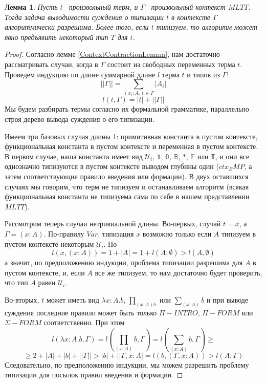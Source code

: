 \documentclass{article}[12pt]
\newtheorem{lemma}{Лемма}
\newcommand{\dash}{\textemdash\ }
\begin{document}
\begin{lemma}
    \label{TypingDecidabilityLemma}
    Пусть $t$ \dash произвольный терм, и $\Gamma$ \dash произвольный контекст $MLTT$. Тогда задача выводимости
    суждения о типизации $t$ в контексте $\Gamma$ алгоритмически разрешима. Более того,
    если $t$ типизуем, то алгоритм может явно предъявить некоторый тип $T$ для $t$.
\end{lemma}
\begin{proof}
    Согласно лемме \ref{ContextContractionLemma}, нам достаточно рассматривать случаи, когда в $\Gamma$ состоит
    из свободных переменных терма $t$. Проведем индукцию по длине суммарной длине $l$ терма $t$ и типов из $\Gamma$:
    $$||\Gamma|| = \sum \limits_{(x_i : A_i) \in \Gamma} |A_i|$$
    $$l(t, \Gamma) = |t| + ||\Gamma||$$
    Мы будем разбирать термы согласно их формальной грамматике, параллельно строя дерево вывода суждения о его
    типизации.

    Имеем три базовых случая длины 1: примитивная константа в пустом контексте, функциональная константа в пустом
    контексте и переменная в пустом контексте. В первом случае, наша константа имеет вид $\mathcal U_i$, 
    $\mathbb 1$, $\mathbb 0$, $\mathbb B$, $*$, $\mathbb F$ или $\mathbb  T$, и они все однозначно типизуются в пустом контексте
    выводом глубины один ($ctx_EMP$, а затем соответствующие правило введения или формации). В двух
    оставшихся случаях мы говорим, что терм не типизуем и останавливаем алгоритм (всякая функциональная
    константа не типизуема сама по себе в нашем представлении $MLTT$).

    Рассмотрим теперь случаи нетривиальной длины. Во-первых, случай $t = x$, а $\Gamma = (x : A)$.
    По-правилу $Var$, типизация $x$ возможно только если $A$ типизуем в пустом контексте некоторым $\mathcal U_i$. Но
    $$l(x, (x : A)) = 1 + |A| = 1 + l(A, \emptyset) > l(A, \emptyset)$$
    а значит, по предположению индукции, проблема типизации разрешима для $A$ в пустом контексте, и,
    если $A$ все же типизуем, то нам достаточно будет проверить, что тип $A$ равен $\mathcal U_i$.
    
    Во-вторых, $t$ может иметь вид $\lambda x : A . b$, $\prod_{(x : A) b}$ или $\sum_{(x : A)} b$ и при
    выводе суждения последние правило может быть только $\Pi-INTRO$, $\Pi-FORM$ или $\Sigma-FORM$
    соответственно. При этом
    $$l(\lambda x : A . b, \Gamma) = l(\prod_{(x : A)} b, \Gamma) = l(\sum_{(x : A)} b, \Gamma) \geq$$
    $$\geq 2 + |A| + |b| + ||\Gamma|| > |b| + ||\Gamma, x : A| = l(b, (\Gamma, x : A)) > l(A, \Gamma)$$
    Следовательно, по предположению индукции, мы можем разрешить проблему типизации для посылок
    правил введения и формации.


\end{proof}
\end{document}
